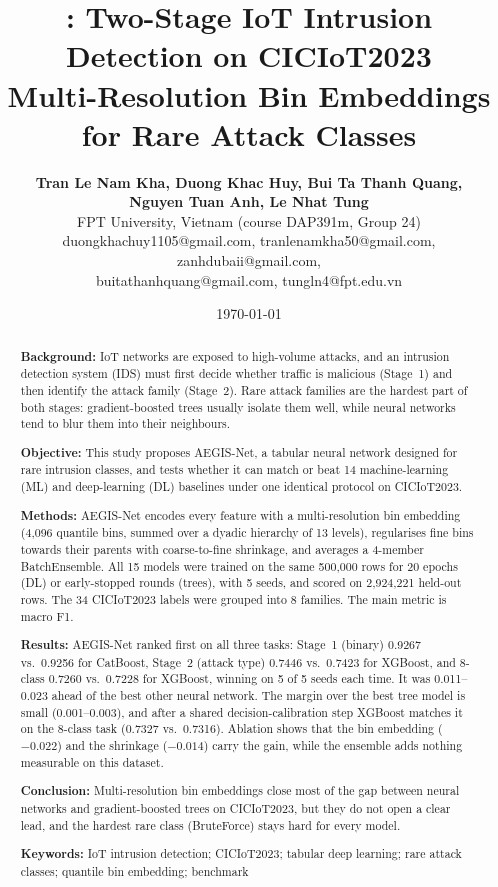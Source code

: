 \documentclass[11pt,a4paper]{article}
\title{\aegis: Two-Stage IoT Intrusion Detection on CICIoT2023\\[2pt]
\large Multi-Resolution Bin Embeddings for Rare Attack Classes}
\author{%
  \textbf{Tran Le Nam Kha, Duong Khac Huy, Bui Ta Thanh Quang,}\\
  \textbf{Nguyen Tuan Anh, Le Nhat Tung}\\[6pt]
  FPT University, Vietnam \quad (course DAP391m, Group 24)\\[3pt]
  {\small duongkhachuy1105@gmail.com, tranlenamkha50@gmail.com, zanhdubaii@gmail.com,}\\
  {\small buitathanhquang@gmail.com, tungln4@fpt.edu.vn}}
\date{\today}
\newcommand{\aegis}{AEGIS-Net}
\begin{document}
\maketitle

\begin{abstract}
\noindent\textbf{Background:} IoT networks are exposed to high-volume attacks, and an intrusion detection system (IDS) must first decide whether traffic is malicious (Stage~1) and then identify the attack family (Stage~2). Rare attack families are the hardest part of both stages: gradient-boosted trees usually isolate them well, while neural networks tend to blur them into their neighbours.

\noindent\textbf{Objective:} This study proposes \aegis, a tabular neural network designed for rare intrusion classes, and tests whether it can match or beat 14 machine-learning (ML) and deep-learning (DL) baselines under one identical protocol on CICIoT2023.

\noindent\textbf{Methods:} \aegis{} encodes every feature with a multi-resolution bin embedding (4{,}096 quantile bins, summed over a dyadic hierarchy of 13 levels), regularises fine bins towards their parents with coarse-to-fine shrinkage, and averages a 4-member BatchEnsemble. All 15 models were trained on the same 500{,}000 rows for 20 epochs (DL) or early-stopped rounds (trees), with 5 seeds, and scored on 2{,}924{,}221 held-out rows. The 34 CICIoT2023 labels were grouped into 8 families. The main metric is macro F1.

\noindent\textbf{Results:} \aegis{} ranked first on all three tasks: Stage~1 (binary) 0.9267 vs.\ 0.9256 for CatBoost, Stage~2 (attack type) 0.7446 vs.\ 0.7423 for XGBoost, and 8-class 0.7260 vs.\ 0.7228 for XGBoost, winning on 5 of 5 seeds each time. It was 0.011--0.023 ahead of the best other neural network. The margin over the best tree model is small (0.001--0.003), and after a shared decision-calibration step XGBoost matches it on the 8-class task (0.7327 vs.\ 0.7316). Ablation shows that the bin embedding ($-0.022$) and the shrinkage ($-0.014$) carry the gain, while the ensemble adds nothing measurable on this dataset.

\noindent\textbf{Conclusion:} Multi-resolution bin embeddings close most of the gap between neural networks and gradient-boosted trees on CICIoT2023, but they do not open a clear lead, and the hardest rare class (BruteForce) stays hard for every model.

\medskip
\noindent\textbf{Keywords:} IoT intrusion detection; CICIoT2023; tabular deep learning; rare attack classes; quantile bin embedding; benchmark
\end{abstract}
\end{document}
